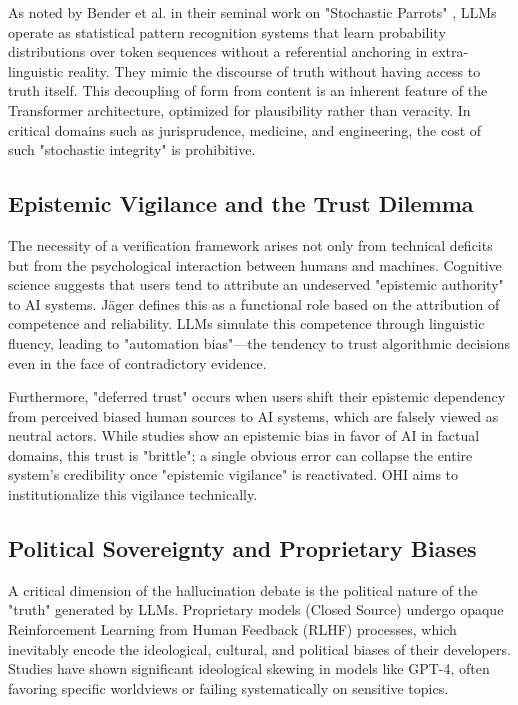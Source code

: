 \documentclass[10pt, a4paper, twocolumn]{article}
\begin{document}
As noted by Bender et al. in their seminal work on "Stochastic Parrots" \cite{bender2021}, LLMs operate as statistical pattern recognition systems that learn probability distributions over token sequences without a referential anchoring in extra-linguistic reality. They mimic the discourse of truth without having access to truth itself. This decoupling of form from content is an inherent feature of the Transformer architecture, optimized for plausibility rather than veracity. In critical domains such as jurisprudence, medicine, and engineering, the cost of such "stochastic integrity" is prohibitive.

\subsection{Epistemic Vigilance and the Trust Dilemma}
The necessity of a verification framework arises not only from technical deficits but from the psychological interaction between humans and machines. Cognitive science suggests that users tend to attribute an undeserved "epistemic authority" to AI systems. Jäger \cite{jaeger2024} defines this as a functional role based on the attribution of competence and reliability. LLMs simulate this competence through linguistic fluency, leading to "automation bias"—the tendency to trust algorithmic decisions even in the face of contradictory evidence.

Furthermore, "deferred trust" occurs when users shift their epistemic dependency from perceived biased human sources to AI systems, which are falsely viewed as neutral actors. While studies show an epistemic bias in favor of AI in factual domains, this trust is "brittle"; a single obvious error can collapse the entire system's credibility once "epistemic vigilance" is reactivated. OHI aims to institutionalize this vigilance technically.

\subsection{Political Sovereignty and Proprietary Biases}
A critical dimension of the hallucination debate is the political nature of the "truth" generated by LLMs. Proprietary models (Closed Source) undergo opaque Reinforcement Learning from Human Feedback (RLHF) processes, which inevitably encode the ideological, cultural, and political biases of their developers. Studies have shown significant ideological skewing in models like GPT-4, often favoring specific worldviews or failing systematically on sensitive topics.
\end{document}
